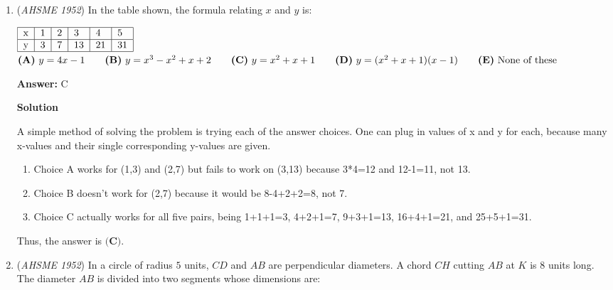 \begin{enumerate}
 $\textbf{(A)}\ 1:2\qquad\textbf{(B)}\ 1:3\qquad\textbf{(C)}\ 1:\sqrt3\qquad\textbf{(D)}\ \sqrt3:2 \qquad\textbf{(E)}\ 2:3$

 \textbf{Answer: }E



\textbf{Solution}

If the radius of the circle is $r$, then the perimeter of the first triangle is $3\left(\frac{2r}{\sqrt3}\right)=2r\sqrt3$, and the perimeter of the second is $3r\sqrt3$. So the ratio is $\boxed{\frac23{\textbf{ (E)}}}$.

 


	\item (\textit{AHSME 1952}) In the table shown, the formula relating $x$ and $y$ is:


 $\begin{tabular}{|l|l|l|l|l|l|} \hline x & 1 & 2 & 3 & 4 & 5 \\ \hline y & 3 & 7 & 13 & 21 &  31 \\ \hline \end{tabular}$
$\textbf{(A)}\ y=4x-1  \qquad \textbf{(B)}\ y=x^{3}-x^{2}+x+2 \qquad \textbf{(C)}\ y=x^2+x+1 \\ \qquad \textbf{(D)}\ y=(x^2+x+1)(x-1) \qquad \textbf{(E)}\ \text{None of these}$

 \textbf{Answer: }C



\textbf{Solution}

A simple method of solving the problem is trying each of the answer choices. One can plug in values of x and y for each, because many x-values and their single corresponding y-values are given.

 
            \begin{enumerate}
        \item Choice A works for (1,3) and (2,7) but fails to work on (3,13) because 3*4=12 and 12-1=11, not 13.
        \item Choice B doesn't work for (2,7) because it would be 8-4+2+2=8, not 7.
        \item Choice C actually works for all five pairs, being 1+1+1=3, 4+2+1=7, 9+3+1=13, 16+4+1=21, and 25+5+1=31.
            \end{enumerate}
            Thus, the answer is $\boxed{\textbf{(C)}}$.

 


	\item (\textit{AHSME 1952}) In a circle of radius $5$ units, $CD$ and $AB$ are perpendicular diameters. A chord $CH$ cutting $AB$ at $K$ is $8$ units long.  The diameter $AB$ is divided into two segments whose dimensions are:



\end{enumerate}
